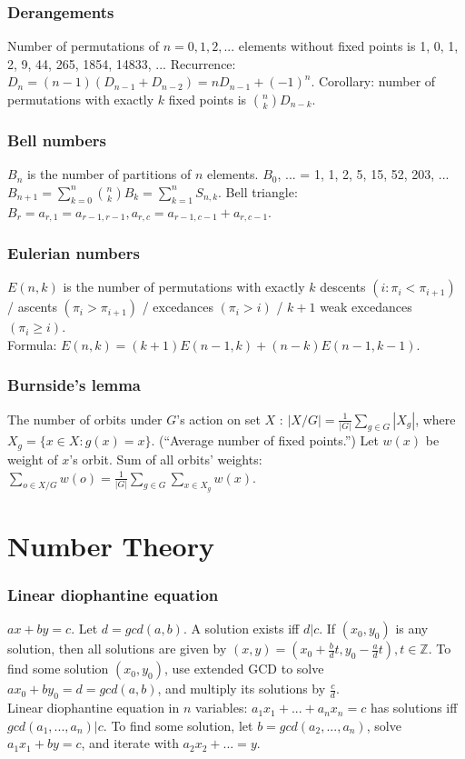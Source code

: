 \documentclass[a4paper,12pt]{article}
\begin{document}
\subsubsection{Derangements}
Number of permutations of $n = 0,1,2,...$ elements without fixed points is 1, 0, 1, 2, 9, 44, 265, 1854, 14833, ... Recurrence: $D_{n} = (n-1)(D_{n-1} + D_{n-2}) = nD_{n-1} + (-1)^{n}$.
Corollary: number of permutations with exactly $k$ fixed points is $\binom{n}{k}D_{n-k}$.

\subsubsection{Bell numbers}
$B_{n}$ is the number of partitions of $n$ elements. $B_0$, ... = 1, 1, 2, 5, 15, 52, 203, ...\\
$B_{n+1} = \sum_{k=0}^{n}\binom{n}{k}B_{k} = \sum_{k=1}^{n} S_{n,k}$. Bell triangle: $B_r = a_{r,1} = a_{r-1,r-1}, a_{r,c} = a_{r-1,c-1} + a_{r,c-1}$.

\subsubsection{Eulerian numbers}
$E(n, k)$ is the number of permutations with exactly $k$ descents $(i : \pi_{i} < \pi_{i+1})$ / ascents $(\pi_{i} > \pi_{i+1})$ / excedances $(\pi_{i} > i)$ / $k + 1$ weak excedances $(\pi_{i} \geq i)$.\\
Formula: $E(n,k) = (k+1)E(n-1,k) + (n-k)E(n-1,k-1)$.

\subsubsection{Burnside's lemma}
The number of orbits under $G$'s action on set $X$ : $|X/G| = \frac{1}{|G|} \sum_{g \in G} |X_g|$, where $X_g = \{x \in X : g(x) = x\}$. (``Average number of fixed points.'')
Let $w(x)$ be weight of $x$'s orbit. Sum of all orbits' weights: $\sum_{o \in X/G}w(o) = \frac{1}{|G|} \sum_{g \in G} \sum_{x \in X_g} w(x)$.

\section{Number Theory}
\subsubsection{Linear diophantine equation}
$ax + by = c$. Let $d = gcd(a,b)$. A solution exists iff $d|c$. If $(x_0, y_0)$ is any solution, then all solutions are given by $(x, y) = (x_0 + \frac{b}{d}t, y_0 - \frac{a}{d}t), t \in \mathbb{Z}$. To find some solution $(x_0, y_0)$,
use extended GCD to solve $ax_0 + by_0 = d = gcd(a, b)$, and multiply its solutions by $\frac{c}{d}$.\\
Linear diophantine equation in $n$ variables: $a_1x_1 + ... + a_nx_n = c$ has solutions iff $gcd(a_1, ..., a_n) | c$. To find some solution, let $b = gcd(a_2, ..., a_n)$, solve $a_1x_1 + by = c$, and iterate with $a_2x_2 + ... = y$.
\end{document}
